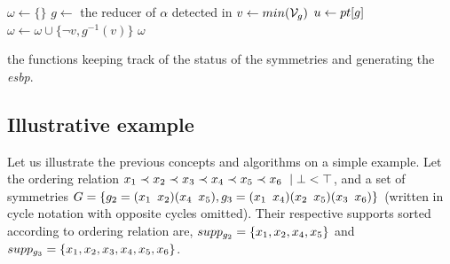  \begin{algorithm}[!htbp]
 	
 	
 	
 	
 	
 	
 	{
 		$\omega \gets \{\}$\;
 		$g \gets$ the reducer of $\alpha$ detected in \isNotMinimal\;
 		$v \gets min(\mathcal{V}_g)$\;
 		$u \gets pt[g] $\;
 		$\omega \gets \omega \cup \{\neg v, g^{-1}(v)\}$\;
 		\Return $\omega$
 	}
 	\caption{the functions keeping track of the status of the symmetries and generating the \emph{esbp}.}
 	\label{algo:keep_status}
 	
 \end{algorithm}
 
 
 
 \subsection{Illustrative example}
  Let us illustrate the previous concepts and algorithms on a simple example. Let the ordering relation $x_1 \prec x_2 \prec x_3 \prec x_4
 \prec x_5 \prec x_6\ \mid \bot < \top$, and a set of symmetries 
 $G = \{
 	g_2 = (x_1 \enskip x_2)(x_4 \enskip x_5),g_3 = (x_1 \enskip x_4)(x_2 \enskip x_5)(x_3 \enskip x_6)\}$
 (written in cycle notation with opposite cycles omitted). Their
 respective supports sorted according to ordering relation are, $supp_{g_{2}} = \{x_1, x_2, x_4, x_5\}$ and
 $supp_{g_3} = \{x_1, x_2, x_3, x_4, x_5, x_6\}$.
 

